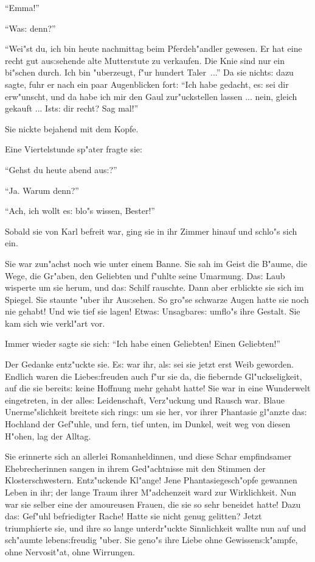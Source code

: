 \documentclass[oneside,12pt]{book}
\newcommand{\s}{s:}%
\begin{document}
"`Emma!"'

"`Wa{\s} denn?"'

"`Wei"st du, ich bin heute nachmittag beim Pferdeh"andler gewesen.
Er hat eine recht gut au{\s}sehende alte Mutterstute zu verkaufen.
Die Knie sind nur ein bi"schen durch. Ich bin "uberzeugt, f"ur
hundert Taler~..."' Da sie nicht{\s} dazu sagte, fuhr er nach ein
paar Augenblicken fort: "`Ich habe gedacht, e{\s} sei dir
erw"unscht, und da habe ich mir den Gaul zur"uckstellen lassen ...
nein, gleich gekauft ... Ist{\s} dir recht? Sag mal!"'

Sie nickte bejahend mit dem Kopfe.

Eine Viertelstunde sp"ater fragte sie:

"`Gehst du heute abend au{\s}?"'

"`Ja. Warum denn?"'

"`Ach, ich wollt e{\s} blo"s wissen, Bester!"'

Sobald sie von Karl befreit war, ging sie in ihr Zimmer hinauf und
schlo"s sich ein.

Sie war zun"achst noch wie unter einem Banne. Sie sah im Geist die
B"aume, die Wege, die Gr"aben, den Geliebten und f"uhlte seine
Umarmung. Da{\s} Laub wisperte um sie herum, und da{\s} Schilf
rauschte. Dann aber erblickte sie sich im Spiegel. Sie staunte
"uber ihr Au{\s}sehen. So gro"se schwarze Augen hatte sie noch nie
gehabt! Und wie tief sie lagen! Etwa{\s} Unsagbare{\s} umflo"s
ihre Gestalt. Sie kam sich wie verkl"art vor.

Immer wieder sagte sie sich: "`Ich habe einen Geliebten! Einen
Geliebten!"'

Der Gedanke ent\/z"uckte sie. E{\s} war ihr, al{\s} sei sie jetzt
erst Weib geworden. Endlich waren die Liebe{\s}freuden auch f"ur
sie da, die fiebernde Gl"uckseligkeit, auf die sie bereit{\s}
keine Hoffnung mehr gehabt hatte! Sie war in eine Wunderwelt
eingetreten, in der alle{\s} Leidenschaft, Verz"uckung und Rausch
war. Blaue Unerme"slichkeit breitete sich ring{\s} um sie her, vor
ihrer Phantasie gl"anzte da{\s} Hochland der Gef"uhle, und fern,
tief unten, im Dunkel, weit weg von diesen H"ohen, lag der Alltag.

Sie erinnerte sich an allerlei Romanheldinnen, und diese Schar
empfindsamer Ehebrecherinnen sangen in ihrem Ged"achtnisse mit den
Stimmen der Klosterschwestern. Ent\/z"uckende Kl"ange! Jene
Phantasiegesch"opfe gewannen Leben in ihr; der lange Traum ihrer
M"adchenzeit ward zur Wirklichkeit. Nun war sie selber eine der
amoureusen Frauen, die sie so sehr beneidet hatte! Dazu da{\s}
Gef"uhl befriedigter Rache! Hatte sie nicht genug gelitten? Jetzt
triumphierte sie, und ihre so lange unterdr"uckte Sinnlichkeit
wallte nun auf und sch"aumte leben{\s}freudig "uber. Sie geno"s
ihre Liebe ohne Gewissen{\s}k"ampfe, ohne Nervosit"at, ohne
Wirrungen.
\end{document}
